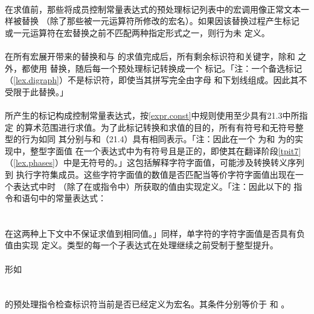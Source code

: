 \paragraph{}
在求值前，那些将成员控制常量表达式的预处理标记列表中的宏调用像正常文本一样被替换
（除了那些被一元运算符所修改的宏名）。如果因该替换过程产生标记
或一元运算符在宏替换之前不匹配两种指定形式之一，则行为未
定义。

\paragraph{}
在所有宏展开带来的替换和与
的求值完成后，所有剩余标识符和关键字，除和
之外，都使用 替换，随后每一个预处理标记转换成一个
标记。「注：一个备选标记（\ref{lex.digraph}）不是标识符，即使当其拼写完全由字母
和下划线组成。因此其不受限于此替换。」

\paragraph{}
所产生的标记构成控制常量表达式，按\ref{expr.const}中规则使用至少具有21.3中所指定
的算术范围进行求值。为了此标记转换和求值的目的，所有有符号和无符号整型的行为如同
其分别与和（21.4）具有相同表示。「注：因此在一个
为和
为的实现中，整型字面值
在一个表达式中为有符号且是正的，即使其在翻译阶段\ref{tpit7}
（\ref{lex.phases}）中是无符号的。」这包括解释字符字面值，可能涉及转换转义序列到
执行字符集成员。这些字符字面值的数值是否匹配当等价字符字面值出现在一个表达式中时
（除了在或指令中）所获取的值由实现定义。「注：因此以下的
指令和语句中的常量表达式：                                    \\
\mbox{}                                     \\
\mbox{}                                     \\
在这两种上下文中不保证求值到相同值。」同样，单字符的字符字面值是否具有负值由实现
定义。类型的每一个子表达式在处理继续之前受制于整型提升。

\paragraph{}
形如                                                                          \\
\mbox{}   \\
\mbox{}    \\
的预处理指令检查标识符当前是否已经定义为宏名。其条件分别等价于
和 。


